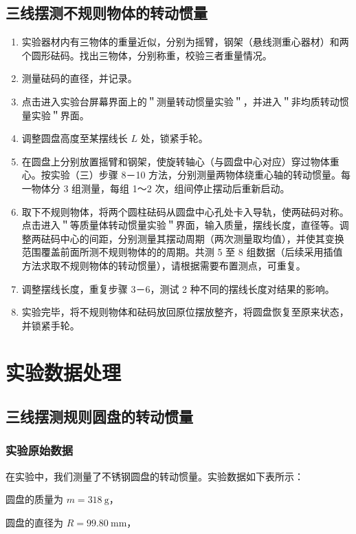 \documentclass{article}
\begin{document}
\subsection{三线摆测不规则物体的转动惯量}
\begin{enumerate}
    \item 实验器材内有三物体的重量近似，分别为摇臂，钢架（悬线测重心器材）和两个圆形砝码。找出三物体，分别称重，校验三者重量情况。
    \item 测量砝码的直径，并记录。
    \item 点击进入实验台屏幕界面上的＂测量转动惯量实验＂，并进入＂非均质转动惯量实验＂界面。
    \item 调整圆盘高度至某摆线长 $L$ 处，锁紧手轮。
    \item 在圆盘上分别放置摇臂和钢架，使旋转轴心（与圆盘中心对应）穿过物体重心。按实验（三）步骤 8－10 方法，分别测量两物体绕重心轴的转动惯量。每一物体分 3 组测量，每组 1～2 次，组间停止摆动后重新启动。
    \item 取下不规则物体，将两个圆柱砝码从圆盘中心孔处卡入导轨，使两砝码对称。点击进入＂等质量体转动惯量实验＂界面，输入质量，摆线长度，直径等。调整两砝码中心的间距，分别测量其摆动周期（两次测量取均值），并使其变换范围覆盖前面所测不规则物体的的周期。共测 5 至 8 组数据（后续采用插值方法求取不规则物体的转动惯量），请根据需要布置测点，可重复。
    \item 调整摆线长度，重复步骤 3－6，测试 2 种不同的摆线长度对结果的影响。
    \item 实验完毕，将不规则物体和砝码放回原位摆放整齐，将圆盘恢复至原来状态，并锁紧手轮。
\end{enumerate}


\section{实验数据处理}
\subsection{三线摆测规则圆盘的转动惯量}

\subsubsection{实验原始数据}

在实验中，我们测量了不锈钢圆盘的转动惯量。实验数据如下表所示：

圆盘的质量为 $m=318 \mathrm{~g}$，

圆盘的直径为 $R=99.80 \mathrm{~mm}$，
\end{document}
